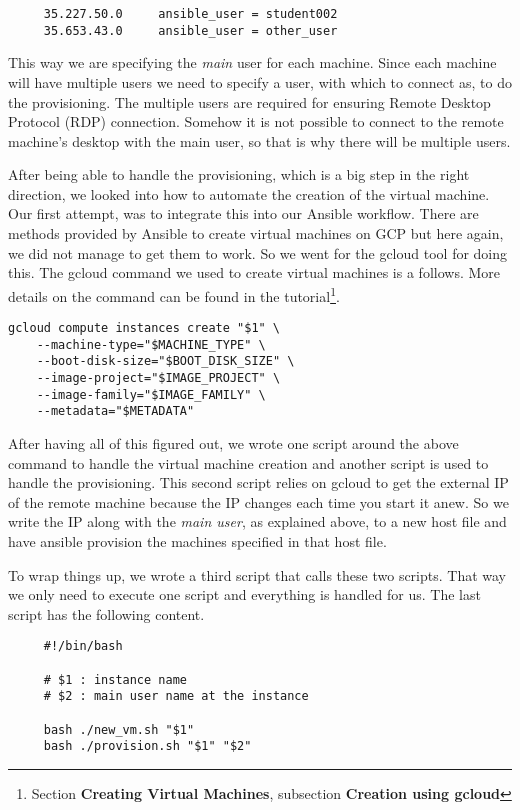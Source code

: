 \begin{verbatim}
	 35.227.50.0	 ansible_user = student002
	 35.653.43.0	 ansible_user = other_user
\end{verbatim}

This way we are specifying the \textit{main} user for each machine.
Since each machine will have multiple users we need to specify a user,
with which to connect as, to do the provisioning. The multiple users
are required for ensuring Remote Desktop Protocol (RDP) connection.
Somehow it is not possible to connect to the remote machine's desktop
with the main user, so that is why there will be multiple users.

After being able to handle the provisioning, which is a big step in
the right direction, we looked into how to automate the creation of
the virtual machine. Our first attempt, was to integrate this into our
Ansible workflow. There are methods provided by Ansible to create
virtual machines on GCP but here again, we did not manage to get them
to work. So we went for the gcloud tool for doing this. The gcloud
command we used to create virtual machines is a follows. More details
on the command can be found in the tutorial\footnote{Section
\textbf{Creating Virtual Machines}, subsection \textbf{Creation using
gcloud}}.

\begin{verbatim}
gcloud compute instances create "$1" \
    --machine-type="$MACHINE_TYPE" \
    --boot-disk-size="$BOOT_DISK_SIZE" \
    --image-project="$IMAGE_PROJECT" \
    --image-family="$IMAGE_FAMILY" \
    --metadata="$METADATA" 
\end{verbatim}

After having all of this figured out, we wrote one script around the
above command to handle the virtual machine creation and another
script is used to handle the provisioning. This second script relies
on gcloud to get the external IP of the remote machine because the IP
changes each time you start it anew. So we write the IP along with the
\textit{main user}, as explained above, to a new host file and have
ansible provision the machines specified in that host file.

To wrap things up, we wrote a third script that calls these two
scripts. That way we only need to execute one script and everything is
handled for us. The last script has the following content.

\begin{verbatim}
	 #!/bin/bash
	 
	 # $1 : instance name
	 # $2 : main user name at the instance
	 
	 bash ./new_vm.sh "$1"
	 bash ./provision.sh "$1" "$2"
\end{verbatim}
